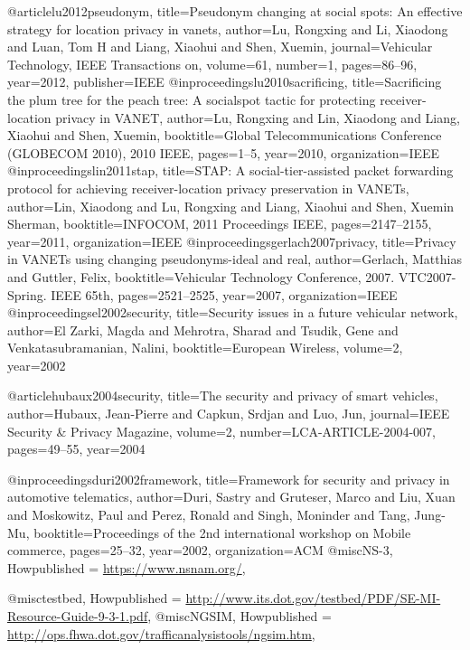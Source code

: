 {{{{{	@article{lu2012pseudonym,
	title={Pseudonym changing at social spots: An effective strategy for location privacy in vanets},
	author={Lu, Rongxing and Li, Xiaodong and Luan, Tom H and Liang, Xiaohui and Shen, Xuemin},
	journal={Vehicular Technology, IEEE Transactions on},
	volume={61},
	number={1},
	pages={86--96},
	year={2012},
	publisher={IEEE}
	}
	@inproceedings{lu2010sacrificing,
	title={Sacrificing the plum tree for the peach tree: A socialspot tactic for protecting receiver-location privacy in VANET},
	author={Lu, Rongxing and Lin, Xiaodong and Liang, Xiaohui and Shen, Xuemin},
	booktitle={Global Telecommunications Conference (GLOBECOM 2010), 2010 IEEE},
	pages={1--5},
	year={2010},
	organization={IEEE}
	}
	@inproceedings{lin2011stap,
	title={STAP: A social-tier-assisted packet forwarding protocol for achieving receiver-location privacy preservation in VANETs},
	author={Lin, Xiaodong and Lu, Rongxing and Liang, Xiaohui and Shen, Xuemin Sherman},
	booktitle={INFOCOM, 2011 Proceedings IEEE},
	pages={2147--2155},
	year={2011},
	organization={IEEE}
	}
	@inproceedings{gerlach2007privacy,
	title={Privacy in VANETs using changing pseudonyms-ideal and real},
	author={Gerlach, Matthias and Guttler, Felix},
	booktitle={Vehicular Technology Conference, 2007. VTC2007-Spring. IEEE 65th},
	pages={2521--2525},
	year={2007},
	organization={IEEE}
	}
	@inproceedings{el2002security,
	title={Security issues in a future vehicular network},
	author={El Zarki, Magda and Mehrotra, Sharad and Tsudik, Gene and Venkatasubramanian, Nalini},
	booktitle={European Wireless},
	volume={2},
	year={2002}
	}
	
	@article{hubaux2004security,
	title={The security and privacy of smart vehicles},
	author={Hubaux, Jean-Pierre and Capkun, Srdjan and Luo, Jun},
	journal={IEEE Security \& Privacy Magazine},
	volume={2},
	number={LCA-ARTICLE-2004-007},
	pages={49--55},
	year={2004}
	}
	
	
	
	@inproceedings{duri2002framework,
	title={Framework for security and privacy in automotive telematics},
	author={Duri, Sastry and Gruteser, Marco and Liu, Xuan and Moskowitz, Paul and Perez, Ronald and Singh, Moninder and Tang, Jung-Mu},
	booktitle={Proceedings of the 2nd international workshop on Mobile commerce},
	pages={25--32},
	year={2002},
	organization={ACM}
	}
	@misc{NS-3,
	Howpublished = {\url{https://www.nsnam.org/}}},
}
@misc{testbed,
	Howpublished = {\url{http://www.its.dot.gov/testbed/PDF/SE-MI-Resource-Guide-9-3-1.pdf}}},
@misc{NGSIM,
	Howpublished = {\url{http://ops.fhwa.dot.gov/trafficanalysistools/ngsim.htm}},
}

}}}}
